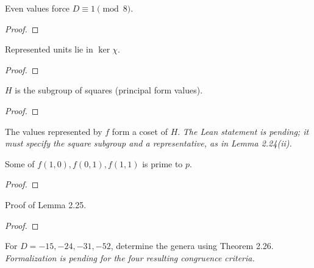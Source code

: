 \begin{theorem}[Exercise 2.17(a)]
  \label{exr:s2_17_a}
  \leanok
  Even values force $D \equiv 1 \pmod 8$.
\end{theorem}
\begin{proof}\end{proof}

\begin{theorem}[Exercise 2.17(b)]
  \label{exr:s2_17_b}
  \leanok
  Represented units lie in $\ker\chi$.
\end{theorem}
\begin{proof}\end{proof}

\begin{theorem}[Exercise 2.17(c)]
  \label{exr:s2_17_c}
  \leanok
  $H$ is the subgroup of squares (principal form values).
\end{theorem}
\begin{proof}\end{proof}

\begin{theorem}[Exercise 2.17(d)]
  \label{exr:s2_17_d}
  \notready
  The values represented by $f$ form a coset of $H$. \emph{The Lean statement
  is pending; it must specify the square subgroup and a representative,
  as in Lemma 2.24(ii).}
\end{theorem}

\begin{theorem}[Exercise 2.18(a)]
  \label{exr:s2_18_a}
  \leanok
  Some of $f(1,0),f(0,1),f(1,1)$ is prime to $p$.
\end{theorem}
\begin{proof}\end{proof}

\begin{theorem}[Exercise 2.18(b)]
  \label{exr:s2_18_b}
  \leanok
  Proof of Lemma 2.25.
\end{theorem}
\begin{proof}\end{proof}

\begin{theorem}[Exercise 2.19]
  \label{exr:s2_19}
  \notready
  For $D=-15,-24,-31,-52$, determine the genera using Theorem 2.26.
  \emph{Formalization is pending for the four resulting congruence criteria.}
\end{theorem}


